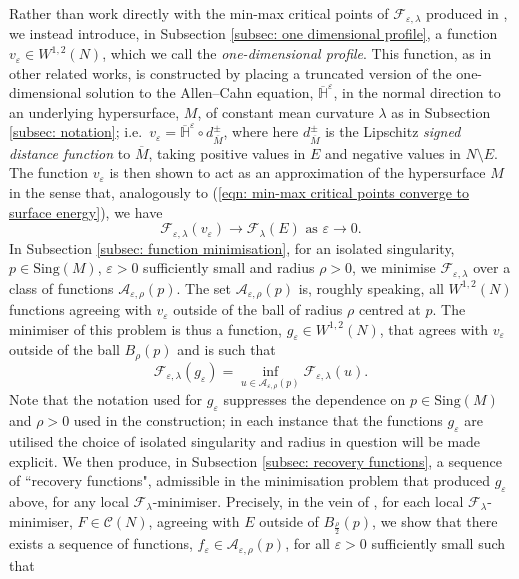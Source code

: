 \documentclass[11pt]{article}
\begin{document}
Rather than work directly with the min-max critical points of $\mathcal{F}_{\varepsilon,\lambda}$ produced in \cite{bellettini-wickramasekera}, we instead introduce, in Subsection \ref{subsec: one dimensional profile}, a function $v_\varepsilon \in W^{1,2}(N)$, which we call the \textit{one-dimensional profile}. This function, as in other related works, is constructed by placing a truncated version of the one-dimensional solution to the Allen--Cahn equation, $\overline{\mathbb{H}}^\varepsilon$, in the normal direction to an underlying hypersurface, $M$, of constant mean curvature $\lambda$ as in Subsection \ref{subsec: notation}; i.e.~$v_\varepsilon = \overline{\mathbb{H}}^\varepsilon \circ d^\pm_{\overline{M}}$, where here $d^\pm_{\overline{M}}$ is the Lipschitz \textit{signed distance function} to $\overline{M}$, taking positive values in $E$ and negative values in $N \setminus E$. The function $v_\varepsilon$ is then shown to act as an approximation of the hypersurface $M$ in the sense that, analogously to (\ref{eqn: min-max critical points converge to surface energy}), we have
\begin{equation}\label{eqn: 1d profile approx cmc energy}
    \mathcal{F}_{\varepsilon,\lambda}(v_\varepsilon) \rightarrow \mathcal{F}_\lambda(E) \text{ as } \varepsilon \rightarrow 0.
\end{equation}
In Subsection \ref{subsec: function minimisation}, for an isolated singularity, $p \in \mathrm{Sing}(M)$, $\varepsilon > 0$ sufficiently small and radius $\rho > 0$, we minimise $\mathcal{F}_{\varepsilon,\lambda}$ over a class of functions $\mathcal{A}_{\varepsilon,\rho}(p)$. The set $\mathcal{A}_{\varepsilon,\rho}(p)$ is, roughly speaking, all $W^{1,2}(N)$ functions agreeing with $v_\varepsilon$ outside of the ball of radius $\rho$ centred at $p$. The minimiser of this problem is thus a function, $g_\varepsilon \in W^{1,2}(N)$, that agrees with $v_\varepsilon$ outside of the ball $B_\rho(p)$ and is such that
\begin{equation}\label{eqn: minimiser function}
    \mathcal{F}_{\varepsilon,\lambda}(g_\varepsilon) = \inf_{u \in \mathcal{A}_{\varepsilon,\rho}(p)} \mathcal{F}_{\varepsilon,\lambda}(u).
\end{equation}
Note that the notation used for $g_\varepsilon$ suppresses the dependence on $p \in \mathrm{Sing}(M)$ and $\rho > 0$ used in the construction; in each instance that the functions $g_\varepsilon$ are utilised the choice of isolated singularity and radius in question will be made explicit. We then produce, in Subsection \ref{subsec: recovery functions}, a sequence of “recovery functions", admissible in the minimisation problem that produced $g_\varepsilon$ above, for any local $\mathcal{F}_\lambda$-minimiser. Precisely, in the vein of \cite{kohn_sternberg_1989}, for each local $\mathcal{F}_\lambda$-minimiser, $F \in \mathcal{C}(N)$, agreeing with $E$ outside of $B_{\frac{\rho}{2}}(p)$, we show that there exists a sequence of functions, $f_\varepsilon \in \mathcal{A}_{\varepsilon,\rho}(p)$, for all $\varepsilon > 0$ sufficiently small such that
\end{document}
